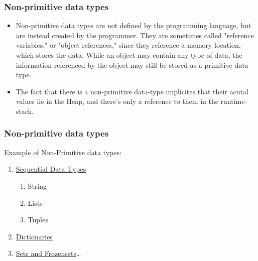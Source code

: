 \documentclass{beamer}
\begin{document}
\begin{frame}[fragile]
\frametitle{Non-primitive data types}
\begin{itemize}
	\item Non-primitive data types are not defined by the programming language, but are instead created by the programmer. They are sometimes called "reference variables," or "object references," since they reference a memory location, which stores the data. 
While an object may contain any type of data, 
the information referenced by the object may still be stored as a primitive data type.
	\item The fact that there is a non-primitive data-type implicites that their acutal values lie in the Heap, and there's only a reference to them in the runtime-stack. 
\end{itemize}
\end{frame}


\begin{frame}[fragile]
\frametitle{Non-primitive data types}
Example of Non-Primitive data types:
\begin{enumerate}
	\item \href{http://www.python-course.eu/sequential_data_types.php}{Sequential Data Types}
	  \begin{enumerate}
	    \item String
	    \item Lists
	    \item Tuples
	  \end{enumerate}
	\item \href{http://www.python-course.eu/dictionaries.php}{Dictionaries}
	\item \href{http://www.python-course.eu/sets_frozensets.php}{Sets and Frozensets}\ldots

\end{enumerate}

\end{frame}

	
\end{document}
